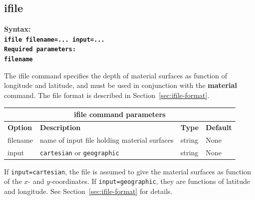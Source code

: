 \documentclass[11pt]{report}
\begin{document}
\subsection{ifile}
\label{keyword:ifile}
\begin{flushleft}\bf
Syntax:\\
\tt ifile filename=... input=...\\
\bf Required parameters:\\
\tt filename
\end{flushleft}
The ifile command specifies the depth of material surfaces as function of longitude and latitude,
and must be used in conjunction with the {\bf material} command. The file format is
described in Section~\ref{sec:ifile-format}.
\begin{center}
\begin{tabular}{|l|p{8cm}|l|l|} \hline
\multicolumn{4}{|c|}{\bf ifile command parameters}\\ \hline
\bf{Option} & \bf{Description} & \bf{Type} & \bf{Default} \\ \hline \hline
filename & name of input file holding material surfaces & string & None  \\ \hline
input & {\tt cartesian} or {\tt geographic} & string & None  \\ \hline
\end{tabular}
\end{center}
If {\tt input=cartesian}, the file is assumed to give the material surfaces as function of the $x$-
and $y$-coordinates. If {\tt input=geographic}, they are functions of latitude and longitude. See
Section~\ref{sec:ifile-format} for details.

\end{document}
